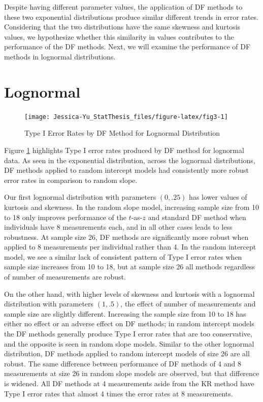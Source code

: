 \documentclass[12pt, twoside]{amherstthesis}
\begin{document}
Despite having different parameter values, the application of DF methods to these two exponential distributions produce similar different trends in error rates. Considering that the two distributions have the same skewness and kurtosis values, we hypothesize whether this similarity in values contributes to the performance of the DF methods. Next, we will examine the performance of DF methods in lognormal distributions.

\hypertarget{lognormal}{%
\section{Lognormal}\label{lognormal}}
\begin{figure}

{\centering \texttt{[image: Jessica-Yu\_StatThesis\_files/figure-latex/fig3-1]} 

}

\caption{Type I Error Rates by DF Method for Lognormal Distribution}\label{fig:fig3}
\end{figure}
Figure \ref{fig:fig3} highlights Type I error rates produced by DF method for lognormal data. As seen in the exponential distribution, across the lognormal distributions, DF methods applied to random intercept models had consistently more robust error rates in comparison to random slope.

Our first lognormal distribution with parameters \((0,.25)\) has lower values of kurtosis and skewness. In the random slope model, increasing sample size from 10 to 18 only improves performance of the \(t\)-as-\(z\) and standard DF method when individuals have 8 measurements each, and in all other cases leads to less robustness. At sample size 26, DF methods are significantly more robust when applied to 8 measurements per individual rather than 4. In the random intercept model, we see a similar lack of consistent pattern of Type I error rates when sample size increases from 10 to 18, but at sample size 26 all methods regardless of number of measurements are robust.

On the other hand, with higher levels of skewness and kurtosis with a lognormal distribution with parameters \((1,.5)\), the effect of number of measurements and sample size are slightly different. Increasing the sample size from 10 to 18 has either no effect or an adverse effect on DF methods; in random intercept models the DF methods generally produce Type I error rates that are too conservative, and the opposite is seen in random slope models. Similar to the other lognormal distribution, DF methods applied to random intercept models of size 26 are all robust. The same difference between performance of DF methods of 4 and 8 measurements at size 26 in random slope models are observed, but that difference is widened. All DF methods at 4 measurements aside from the KR method have Type I error rates that almost 4 times the error rates at 8 measurements.
\end{document}
